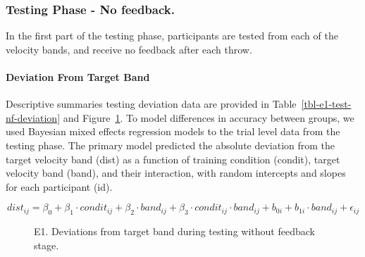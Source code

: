 \documentclass[
  letterpaper,
  DIV=11,
  numbers=noendperiod,
  oneside]{scrartcl}
\let\oldparagraph\paragraph
\renewcommand{\paragraph}[1]{\oldparagraph{#1}\mbox{}}
\begin{document}
\subsubsection{Testing Phase - No
feedback.}\label{testing-phase---no-feedback.}

In the first part of the testing phase, participants are tested from
each of the velocity bands, and receive no feedback after each throw.

\paragraph{Deviation From Target Band}\label{deviation-from-target-band}

Descriptive summaries testing deviation data are provided in
Table~\ref{tbl-e1-test-nf-deviation} and Figure~\ref{fig-e1-test-dev}.
To model differences in accuracy between groups, we used Bayesian mixed
effects regression models to the trial level data from the testing
phase. The primary model predicted the absolute deviation from the
target velocity band (dist) as a function of training condition
(condit), target velocity band (band), and their interaction, with
random intercepts and slopes for each participant (id).

\begin{equation}
dist_{ij} = \beta_0 + \beta_1 \cdot condit_{ij} + \beta_2 \cdot band_{ij} + \beta_3 \cdot condit_{ij} \cdot band_{ij} + b_{0i} + b_{1i} \cdot band_{ij} + \epsilon_{ij}
\end{equation}

\begin{figure}


\caption{\label{fig-e1-test-dev}E1. Deviations from target band during
testing without feedback stage.}

\end{figure}%
\end{document}
